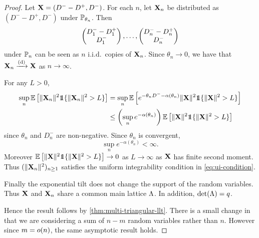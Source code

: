 \begin{proof}
    Let $\vX = (D^- - D^+, D^-)$. For each $n$, let $\vX_n$ be distributed as $(D^- - D^+, D^-)$ under $\P_{\theta_n}$. Then
    \begin{equation*}
        \vectwo{D_1^- - D_1^+}{D_1^-},
        \ldots,
        \vectwo{D_n^- - D_n^+}{D_n^-}
    \end{equation*}
    under $\P_n$ can be seen as $n$ i.i.d.\ copies of $\vX_n$. Since $\theta_n \to 0$, we have that $\vX_n \todist \vX$ as $n \to \infty$. 

    For any $L > 0$,
    \begin{align*}
        \sup_n \E \left[ 
            \norm{\vX_n}^2 \one\{\norm{\vX_n}^2 > L\}
        \right]
        &=
        \sup_n \E \left[ 
            e^{- \theta_n D^- - \alpha(\theta_n)}
            \norm{\vX}^2 \one\{\norm{\vX}^2 > L\}
        \right] \\
        &\leq
        \left(\sup_n e^{- \alpha(\theta_n)}\right) 
        \E \left[ 
            \norm{\vX}^2 \one\{\norm{\vX}^2 > L\}
        \right]
    \end{align*}
    since $\theta_n$ and $D^-_n$ are non-negative. Since $\theta_n$ is convergent,
    \begin{equation*}
        \sup_n e^{-\alpha(\theta_n)} < \infty.
    \end{equation*}
    Moreover $\E \left[ \norm{\vX}^2 \one\{\norm{\vX}^2 > L\} \right] \to 0$ as $L \to \infty$ as $\vX$ has finite second moment. Thus $(\norm{\vX_n}^2)_{n \geq 1}$ satisfies the uniform integrability condition in \cref{eq:ui-condition}.

    Finally the exponential tilt does not change the support of the random variables. Thus $\vX$ and $\vX_n$ share a common main lattice $\lattice$. In addition, $\det(\lattice) = q$.

    Hence the result follows by \cref{thm:multi-triangular-llt}. There is a small change in that we are considering a sum of $n - m$ random variables rather than $n$. However since $m = \littleo(n)$, the same asymptotic result holds.
\end{proof}

